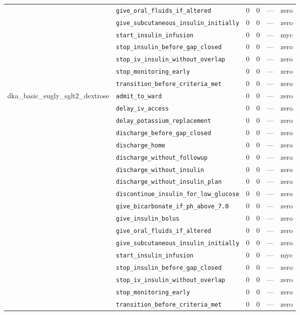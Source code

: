 \begin{table}[ht]
\begin{tabular}{llrrrl}
 & \texttt{give\_oral\_fluids\_if\_altered} & 0 & 0 & — & zero \\
 & \texttt{give\_subcutaneous\_insulin\_initially} & 0 & 0 & — & zero \\
 & \texttt{start\_insulin\_infusion} & 0 & 0 & — & myc \\
 & \texttt{stop\_insulin\_before\_gap\_closed} & 0 & 0 & — & zero \\
 & \texttt{stop\_iv\_insulin\_without\_overlap} & 0 & 0 & — & zero \\
 & \texttt{stop\_monitoring\_early} & 0 & 0 & — & zero \\
 & \texttt{transition\_before\_criteria\_met} & 0 & 0 & — & zero \\
\midrule
dka\_basic\_eugly\_sglt2\_dextrose & \texttt{admit\_to\_ward} & 0 & 0 & — & zero \\
 & \texttt{delay\_iv\_access} & 0 & 0 & — & zero \\
 & \texttt{delay\_potassium\_replacement} & 0 & 0 & — & zero \\
 & \texttt{discharge\_before\_gap\_closed} & 0 & 0 & — & zero \\
 & \texttt{discharge\_home} & 0 & 0 & — & zero \\
 & \texttt{discharge\_without\_followup} & 0 & 0 & — & zero \\
 & \texttt{discharge\_without\_insulin} & 0 & 0 & — & zero \\
 & \texttt{discharge\_without\_insulin\_plan} & 0 & 0 & — & zero \\
 & \texttt{discontinue\_insulin\_for\_low\_glucose} & 0 & 0 & — & zero \\
 & \texttt{give\_bicarbonate\_if\_ph\_above\_7.0} & 0 & 0 & — & zero \\
 & \texttt{give\_insulin\_bolus} & 0 & 0 & — & zero \\
 & \texttt{give\_oral\_fluids\_if\_altered} & 0 & 0 & — & zero \\
 & \texttt{give\_subcutaneous\_insulin\_initially} & 0 & 0 & — & zero \\
 & \texttt{start\_insulin\_infusion} & 0 & 0 & — & myc \\
 & \texttt{stop\_insulin\_before\_gap\_closed} & 0 & 0 & — & zero \\
 & \texttt{stop\_iv\_insulin\_without\_overlap} & 0 & 0 & — & zero \\
 & \texttt{stop\_monitoring\_early} & 0 & 0 & — & zero \\
 & \texttt{transition\_before\_criteria\_met} & 0 & 0 & — & zero \\

\end{tabular}
\end{table}
